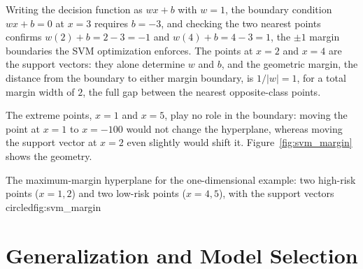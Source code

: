 \documentclass[../ai_in_finance]{subfiles}
\begin{document}
Writing the decision function as $w x + b$ with $w=1$, the boundary condition $wx+b=0$ at $x=3$ requires $b=-3$, and checking the two nearest points confirms $w(2)+b = 2-3=-1$ and $w(4)+b=4-3=1$, the $\pm 1$ margin boundaries the SVM optimization enforces. The points at $x=2$ and $x=4$ are the support vectors: they alone determine $w$ and $b$, and the geometric margin, the distance from the boundary to either margin boundary, is $1/|w|=1$, for a total margin width of $2$, the full gap between the nearest opposite-class points.

The extreme points, $x=1$ and $x=5$, play no role in the boundary: moving the point at $x=1$ to $x=-100$ would not change the hyperplane, whereas moving the support vector at $x=2$ even slightly would shift it. Figure~\ref{fig:svm_margin} shows the geometry.

\begin{bookfigure}[htbp]{The maximum-margin hyperplane for the one-dimensional example: two high-risk points ($x=1,2$) and two low-risk points ($x=4,5$), with the support vectors circled}{fig:svm_margin}
\end{bookfigure}

\section{Generalization and Model Selection}
\end{document}
